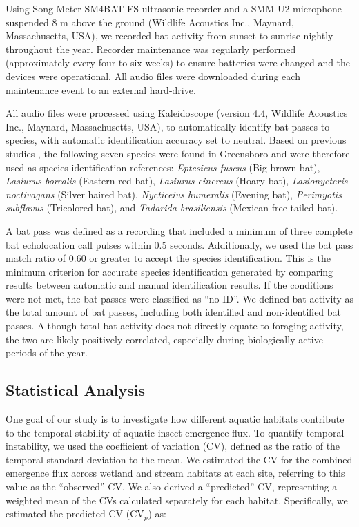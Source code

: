 \documentclass[11pt, class=article, crop=false]{standalone}
\begin{document}
Using Song Meter SM4BAT-FS ultrasonic recorder and a SMM-U2 microphone suspended 8 m above the ground (Wildlife Acoustics Inc., Maynard, Massachusetts, USA), we recorded bat activity from sunset to sunrise nightly throughout the year.
Recorder maintenance was regularly performed (approximately every four to six weeks) to ensure batteries were changed and the devices were operational.
All audio files were downloaded during each maintenance event to an external hard-drive.  

All audio files were processed using Kaleidoscope (version 4.4, Wildlife Acoustics Inc., Maynard, Massachusetts, USA), to automatically identify bat passes to species, with automatic identification accuracy set to neutral.
Based on previous studies \citep{parker_rapid_2019, li_four_2021}, the following seven species were found in Greensboro and were therefore used as species identification references: \textit{Eptesicus fuscus} (Big brown bat), \textit{Lasiurus borealis} (Eastern red bat), \textit{Lasiurus cinereus} (Hoary bat), \textit{Lasionycteris noctivagans} (Silver haired bat), \textit{Nycticeius humeralis} (Evening bat), \textit{Perimyotis subflavus} (Tricolored bat), and \textit{Tadarida brasiliensis} (Mexican free-tailed bat).

A bat pass was defined as a recording that included a minimum of three complete bat echolocation call pulses within 0.5 seconds.
Additionally, we used the bat pass match ratio of 0.60 or greater to accept the species identification.
This is the minimum criterion for accurate species identification generated by comparing results between automatic and manual identification results.
If the conditions were not met, the bat passes were classified as ``no ID''. 
We defined bat activity as the total amount of bat passes, including both identified and non-identified bat passes.
Although total bat activity does not directly equate to foraging activity, the two are likely positively correlated, especially during biologically active periods of the year.

\subsection{Statistical Analysis}


One goal of our study is to investigate how different aquatic habitats contribute to the temporal stability of aquatic insect emergence flux.
To quantify temporal instability, we used the coefficient of variation (CV), defined as the ratio of the temporal standard deviation to the mean.
We estimated the CV for the combined emergence flux across wetland and stream habitats at each site, referring to this value as the ``observed'' CV. 
We also derived a ``predicted'' CV, representing a weighted mean of the CVs calculated separately for each habitat.
Specifically, we estimated the predicted CV ($\mbox{CV}_p$) as:
\end{document}

